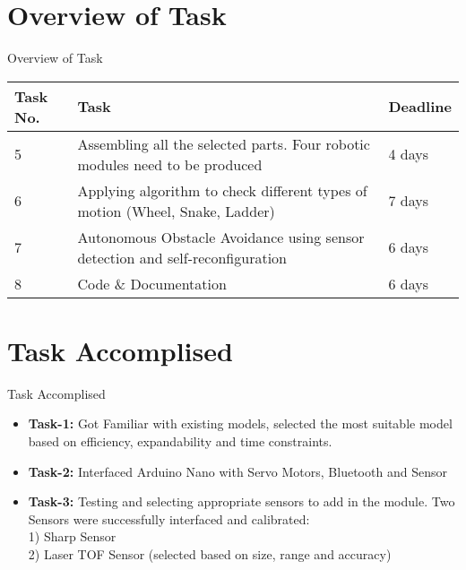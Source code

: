 \documentclass[10pt, a4paper]{beamer}
\begin{document}
\section{Overview of Task}
\begin{frame}{Overview of Task}
	
	\begin{center}
    \begin{tabular}{ | l | p{5cm} | l |}
    \hline
     \textbf{Task No.} & \textbf{Task} & \textbf{Deadline}\\ \hline
     
     
     5 & Assembling all the selected parts. Four robotic modules need to be produced & 4 days  \\ \hline
     
     6 & Applying algorithm to check different types of motion (Wheel, Snake, Ladder)  & 7 days  \\ \hline
     
     7 & Autonomous Obstacle Avoidance using sensor detection and self-reconfiguration & 6 days  \\ \hline
     
     8 & Code \& Documentation & 6 days  \\ \hline
    
    
    \end{tabular}
\end{center}

   

	
\end{frame}

\section{Task Accomplised}
\begin{frame}{Task Accomplised}
	\begin{itemize}
		\item \textbf{Task-1:} Got Familiar with existing models, selected the most suitable model based on efficiency, expandability and time constraints.\linebreak
		\item \textbf{Task-2:} Interfaced Arduino Nano with Servo Motors, Bluetooth and Sensor\linebreak
		\item \textbf{Task-3:} Testing and selecting appropriate sensors to add in the module.
	Two Sensors were successfully interfaced and calibrated:
	\\1) Sharp Sensor         
	\\2) Laser TOF Sensor (selected based on size, range and accuracy)\linebreak



		
	\end{itemize}
\end{frame}
\end{document}
